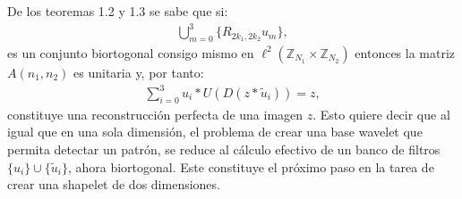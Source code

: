 \par De los teoremas 1.2 y 1.3 se sabe que si:
\begin{eqnarray}
\bigcup_{m=0}^{3}\{R_{2k_1,2k_2}u_m\},\nonumber
\end{eqnarray}
es un conjunto biortogonal consigo mismo en $\ell^2(\mathbb{Z}_{N_1}\times\mathbb{Z}_{N_2})$ entonces la matriz $A(n_1,n_2)$ es unitaria y, por tanto:
\begin{eqnarray}
\sum_{i=0}^3 u_i\ast U(D(z\ast\tilde{u}_i))=z,\nonumber
\end{eqnarray}
constituye una reconstrucci\'on perfecta de una imagen $z$. Esto quiere decir que al igual que en una sola dimensi\'on, el problema de crear una base wavelet que permita detectar un patr\'on, se reduce al c\'alculo efectivo de un banco de filtros $\{u_i\}\cup\{\tilde{u}_i\}$, ahora biortogonal. Este constituye el pr\'oximo paso en la tarea de crear una shapelet de dos dimensiones.\\